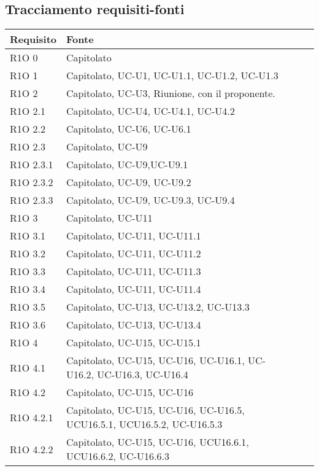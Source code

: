 \subsection{Tracciamento requisiti-fonti}

\begin{center}
  \bgroup
  \def\arraystretch{1.8}
  \begin{longtable}{ | l | p{2cm} | p{4.7cm} | p{2cm} |}
    \hline
    \cellcolor[gray]{0.9} \textbf{Requisito} &   
    \cellcolor[gray]{0.9} \textbf{Fonte}\\ \hline
    R1O 0 & Capitolato \\ \hline
    R1O 1 & Capitolato, UC-U1, UC-U1.1, UC-U1.2, UC-U1.3 \\ \hline
    R1O 2 & Capitolato, UC-U3, Riunione, con il proponente. \\ \hline
    R1O 2.1 & Capitolato, UC-U4, UC-U4.1, UC-U4.2 \\ \hline
    R1O 2.2 & Capitolato, UC-U6, UC-U6.1\\ \hline
    R1O 2.3 & Capitolato, UC-U9 \\ \hline
    R1O 2.3.1 & Capitolato, UC-U9,UC-U9.1 \\ \hline
    R1O 2.3.2 & Capitolato, UC-U9, UC-U9.2 \\ \hline
    R1O 2.3.3 & Capitolato, UC-U9, UC-U9.3, UC-U9.4\\ \hline
    R1O 3 & Capitolato, UC-U11 \\ \hline
    R1O 3.1 & Capitolato, UC-U11, UC-U11.1\\ \hline
    R1O 3.2 & Capitolato, UC-U11, UC-U11.2\\ \hline
    R1O 3.3 & Capitolato, UC-U11, UC-U11.3\\ \hline
    R1O 3.4 & Capitolato, UC-U11, UC-U11.4\\ \hline
    R1O 3.5 & Capitolato, UC-U13, UC-U13.2, UC-U13.3\\ \hline
    R1O 3.6 & Capitolato, UC-U13, UC-U13.4\\ \hline
    R1O 4 & Capitolato, UC-U15, UC-U15.1 \\ \hline
    R1O 4.1 & Capitolato, UC-U15, UC-U16, UC-U16.1, UC-U16.2, UC-U16.3, UC-U16.4 \\ \hline
    R1O 4.2 & Capitolato, UC-U15, UC-U16 \\ \hline
    R1O 4.2.1 & Capitolato, UC-U15, UC-U16, UC-U16.5, UCU16.5.1, UCU16.5.2, UC-U16.5.3 \\ \hline
    R1O 4.2.2 & Capitolato, UC-U15, UC-U16, UCU16.6.1, UCU16.6.2, UC-U16.6.3 \\ \hline

\end{longtable}
\end{center}

